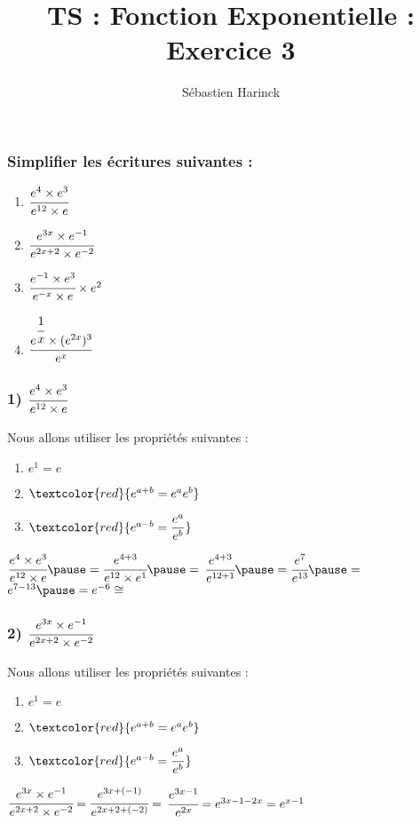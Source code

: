 \documentclass[t]{beamer}
\title{TS : Fonction Exponentielle : Exercice 3}
\author{Sébastien Harinck}
\institute{www.cours-futes.com}
\date{}
\begin{document}
\begin{frame}
\titlepage
\end{frame}

\begin{frame}
\frametitle{Simplifier les écritures suivantes :}
\pause
\begin{enumerate}
\item<+-> \( \cfrac{e^4 \times e^3}{e^{12} \times e}\)
\item<+-> \( \cfrac{e^{3x} \times e^{-1}}{e^{2x+2} \times e^{-2}}\)
\item<+-> \( \cfrac{e^{-1} \times e^3}{e^{-x} \times e} \times e^2\)
\item<+-> \( \cfrac{e^{\cfrac{1}{x}} \times (e^{2x})^3 }{e^{x}}\)
\end{enumerate}
\end{frame}

\begin{frame}
\frametitle{1) \( \cfrac{e^4 \times e^3}{e^{12} \times e} \)}
\pause
Nous allons utiliser les propriétés suivantes :
\pause
\begin{enumerate}
\item<+-> \( e^1 = e \)
\item<+-> \( \textcolor{red}{ e^{a+b} = e^ae^b } \)
\item<+-> \( \textcolor{red}{ e^{a-b} = \dfrac{e^a}{e^b} } \)
\end{enumerate}
\pause
\( \cfrac{e^4 \times e^3}{e^{12} \times e} \pause = \cfrac{e^{4+3}}{e^{12} \times e^1} \pause =\)
\( \cfrac{e^{4+3}}{e^{12+1}} \pause = \cfrac{e^7}{e^{13}} \pause = \)
\( e^{7-13} \pause = e^{-6} \cong \)
\end{frame}

\begin{frame}
\frametitle{2) \( \cfrac{e^{3x} \times e^{-1}}{e^{2x+2} \times e^{-2}}\)}
\pause
Nous allons utiliser les propriétés suivantes :
\pause
\begin{enumerate}
\item<+-> \( e^1 = e \)
\item<+-> \( \textcolor{red}{ e^{a+b} = e^ae^b } \)
\item<+-> \( \textcolor{red}{ e^{a-b} = \dfrac{e^a}{e^b} } \)
\end{enumerate}
\pause
\( \cfrac{e^{3x} \times e^{-1}}{e^{2x+2} \times e^{-2}} = \cfrac{e^{3x + (-1)}}{e^{2x+2 + (-2)}} =\)
\( \cfrac{e^{3x -1}}{e^{2x}} = e^{3x-1-2x} = e^{x-1} \)
\end{frame}
\end{document}
